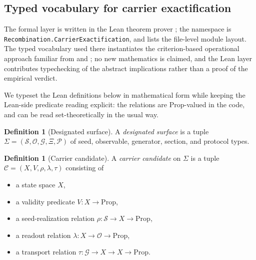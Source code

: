 \documentclass[11pt]{article}
\theoremstyle{definition}
\newtheorem{definition}[theorem]{Definition}
\begin{document}
\subsection{Typed vocabulary for carrier exactification}

The formal layer is written in the Lean theorem prover \citep{deMouraEtAl2015}; the
namespace is \nolinkurl{Recombination.CarrierExactification}, and
 lists the file-level module layout. The
typed vocabulary used there instantiates the criterion-based operational approach
familiar from \citet{Hardy2001} and \citet{ChiribellaDArianoPerinotti2011}; no new
mathematics is claimed, and the Lean layer contributes typechecking of the abstract
implications rather than a proof of the empirical verdict.

We typeset the Lean definitions below in mathematical form while keeping the
Lean-side predicate reading explicit: the relations are \textup{Prop}-valued in
the code, and can be read set-theoretically in the usual way.

\begin{definition}[Designated surface]
A \emph{designated surface} is a tuple
$\Sigma = (\mathcal{S}, \mathcal{O}, \mathcal{G}, \Xi, \mathcal{P})$ of seed,
observable, generator, section, and protocol types.
\end{definition}

\begin{definition}[Carrier candidate]
\label{def:carrier-candidate}
A \emph{carrier candidate} on $\Sigma$ is a tuple
$\mathcal{C} = (X, V, \rho, \lambda, \tau)$ consisting of
\begin{itemize}[leftmargin=2em, itemsep=0pt, topsep=2pt]
\item a state space $X$,
\item a validity predicate $V \colon X \to \mathrm{Prop}$,
\item a seed-realization relation $\rho \colon \mathcal{S} \to X \to \mathrm{Prop}$,
\item a readout relation $\lambda \colon X \to \mathcal{O} \to \mathrm{Prop}$,
\item a transport relation $\tau \colon \mathcal{G} \to X \to X \to \mathrm{Prop}$.
\end{itemize}
\end{definition}
\end{document}
